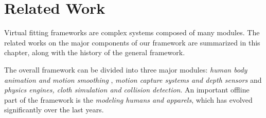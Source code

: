 \chapter{Related Work}
\label{chapter_related_work}

Virtual fitting frameworks are complex systems composed of many modules. The related works on the major components of our framework are summarized in this chapter, 
along with the history of the general framework. 

The overall framework can be divided into three major modules: \textit{human body animation and motion smoothing} , \textit{motion capture systems and depth sensors} and 
\textit{physics engines, cloth simulation and collision detection}. An important offline part of the framework is the \textit{modeling humans and apparels}, which has evolved 
significantly over the last years. 